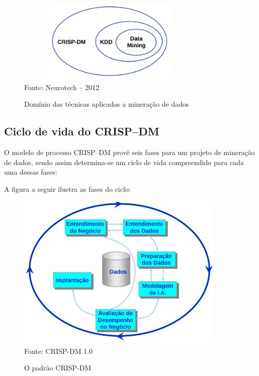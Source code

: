 \begin{figure}[!ht]
\centering
\caption{Domínio das técnicas aplicadas a mineração de dados}
\vspace{1mm}
\includegraphics[width=90mm, height=40mm]{Figuras/BigData/RelacaoCrispKddDm.png}\\
\tiny Fonte: Neurotech -- 2012
\end{figure}

\pagebreak

\subsection{Ciclo de vida do CRISP--DM}

O modelo de processo CRISP--DM provê seis fases para um projeto de mineração de dados, sendo assim determina-se um ciclo de vida 
compreendido para cada uma dessas fases:

A figura a seguir ilustra as fases do ciclo:

\begin{figure}[!ht]
\centering
\caption{O padrão CRISP-DM \cite{Crisp2000}}
\vspace{1mm}
\includegraphics[width=100mm, height=75mm]{Figuras/BigData/CrispDM.png}\\
\tiny Fonte: CRISP-DM 1.0
\end{figure}

